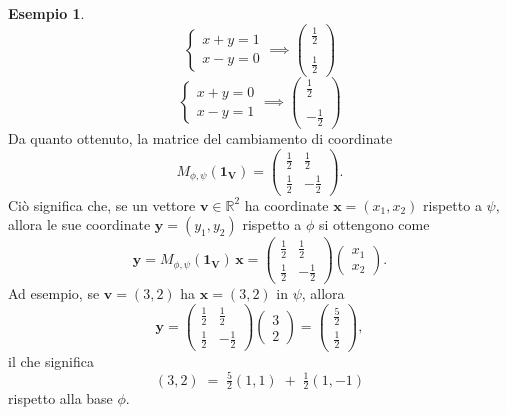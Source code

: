 \documentclass{article}
\theoremstyle{plain}
\theoremstyle{definition}
\newtheorem{exmp}{Esempio}[section]
\theoremstyle{remark}
\begin{document}
\begin{exmp}
\[\begin{cases}
    x+y=1\\
    x-y=0
\end{cases}\implies\begin{pmatrix}
    \frac{1}{2}\\\\
    \frac{1}{2}
\end{pmatrix}\]
\[\begin{cases}
    x+y=0\\
    x-y=1
\end{cases}\implies\begin{pmatrix}
    \frac{1}{2}\\\\
    -\frac{1}{2}
\end{pmatrix}\]
Da quanto ottenuto, la matrice del cambiamento di coordinate
\[
M_{\phi,\psi}(\mathbf{1_V})
=
\begin{pmatrix}
  \tfrac12 & \tfrac12 \\[6pt]
  \tfrac12 & -\tfrac12
\end{pmatrix}.
\]
Ciò significa che, se un vettore \(\mathbf{v}\in\mathbb{R}^2\) ha coordinate \(\mathbf{x} = (x_1, x_2)\) rispetto a \(\psi\), allora le sue coordinate \(\mathbf{y} = (y_1, y_2)\) rispetto a \(\phi\) si ottengono come
\[
\mathbf{y} 
=
M_{\phi,\psi}(\mathbf{1_V}) \,\mathbf{x}
=
\begin{pmatrix}
  \tfrac12 & \tfrac12 \\[6pt]
  \tfrac12 & -\tfrac12
\end{pmatrix}
\begin{pmatrix}
  x_1 \\[4pt] x_2
\end{pmatrix}.
\]
Ad esempio, se \(\mathbf{v} = (3,2)\) ha \(\mathbf{x} = (3,2)\) in \(\psi\), allora
\[
\mathbf{y}
=
\begin{pmatrix}
  \tfrac12 & \tfrac12 \\[6pt]
  \tfrac12 & -\tfrac12
\end{pmatrix}
\begin{pmatrix}
  3 \\[4pt] 2
\end{pmatrix}
=
\begin{pmatrix}
  \tfrac{5}{2} \\[6pt] \tfrac{1}{2}
\end{pmatrix},
\]
il che significa
\[
(3,2) \;=\; \tfrac{5}{2}(1,1) \;+\; \tfrac{1}{2}(1,-1)
\]
rispetto alla base \(\phi\).
\end{exmp}
\end{document}
